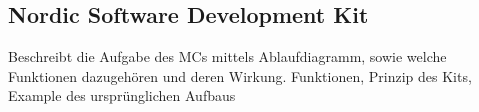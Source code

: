 \subsection{Nordic Software Development Kit}\label{sec:nordicsdk}

Beschreibt die Aufgabe des MCs mittels Ablaufdiagramm, sowie welche Funktionen dazugehören und deren Wirkung.
Funktionen, Prinzip des Kits, Example des ursprünglichen Aufbaus